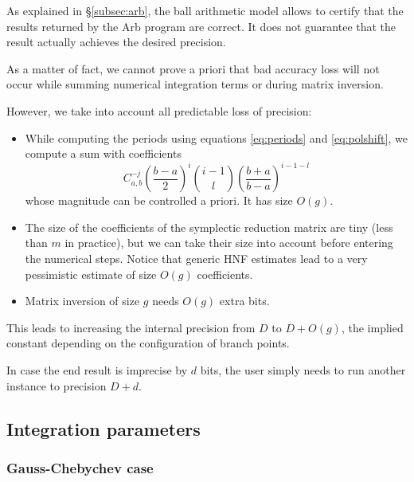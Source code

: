 \documentclass[main.tex]{subfiles}
\begin{document}
   As explained in \S \ref{subsec:arb}, the ball arithmetic model allows
   to certify that the results returned by the Arb program \cite{Johansson2013arb} are correct.
   It does not guarantee that the result actually achieves the desired
   precision.

   As a matter of fact, we cannot prove a priori that bad accuracy loss
   will not occur while summing numerical integration terms or
   during matrix inversion.

   However, we take into account all predictable loss of precision:
   \begin{itemize}
       \item While computing the periods using equations \eqref{eq:periods}
           and \eqref{eq:polshift}, we compute a sum with coefficients
           \begin{equation*}
               C_{a,b}^{-j} \left(\frac{b-a}{2}\right)^i
               {i-1 \choose l} \left(\frac{b+a}{b-a}\right)^{i-1-l}
           \end{equation*}
           whose magnitude can be controlled a priori. It has size $O(g)$.
       \item The size of the coefficients of the symplectic reduction
           matrix are tiny (less than $m$ in practice), but we can take
           their size into account before entering the numerical steps.
           Notice that generic HNF estimates lead to a very pessimistic
           estimate of size $O(g)$ coefficients.
       \item Matrix inversion of size $g$ needs $O(g)$ extra bits.
   \end{itemize}
   This leads to increasing the internal precision from $D$ to $D + O(g)$,
   the implied constant depending on the configuration of branch points.

   \begin{rmk}
   In case the end result is imprecise by $d$ bits, the user simply needs to
   run another instance to precision $D+d$.
   \end{rmk}

   \subsection{Integration parameters}

   \subsubsection{Gauss-Chebychev case}
\end{document}
